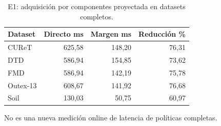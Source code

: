 \begin{table}[!htbp]\centering
\fontsize{9}{11}\selectfont\setlength{\tabcolsep}{4pt}
\caption{E1: adquisición por componentes proyectada en datasets completos.}\label{tab:e1-fixed4-costs}
\begin{tabular}{@{}lrrr@{}}\toprule
Dataset & Directo ms & Margen ms & Reducción \%\\\midrule
CUReT & 625,58 & 148,20 & 76,31\\
DTD & 586,94 & 154,85 & 73,62\\
FMD & 586,94 & 142,19 & 75,78\\
Outex-13 & 608,67 & 141,92 & 76,68\\
Soil & 130,03 & 50,75 & 60,97\\
\bottomrule\end{tabular}
\par\smallskip\begin{minipage}{0.98\textwidth}\footnotesize No es una nueva medición online de latencia de políticas completas.\end{minipage}
\end{table}
